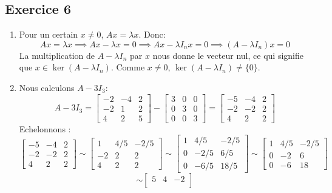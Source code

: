 \documentclass{article}
\begin{document}
\subsection*{Exercice 6}
\begin{enumerate}
    \item Pour un certain $x \neq 0$, $Ax=\lambda x$. Donc:
    $$Ax=\lambda x \implies Ax-\lambda x = 0 \implies Ax - \lambda I_nx = 0 \implies (A-\lambda I_n)x = 0$$
    La multiplication de $A-\lambda I_n$ par  $x$ nous donne le vecteur nul, ce qui signifie que $x \in \ker (A-\lambda I_n)$. Comme $x \neq 0$, $\ker (A-\lambda I_n) \neq \{0 \}$.
    \item Nous calculons $A-3I_3$:
    $$A-3I_3 = \begin{bmatrix} -2 & -4 & 2 \\ -2 & 1 & 2 \\ 4 & 2 & 5 \end{bmatrix} - \begin{bmatrix} 3 & 0 & 0 \\ 0 & 3 & 0 \\ 0 & 0 & 3 \end{bmatrix} = \begin{bmatrix} -5 & -4 & 2 \\ -2 & -2 & 2 \\ 4 & 2 & 2 \end{bmatrix}$$
    Echelonnons :
    $$\begin{bmatrix} -5 & -4 & 2 \\ 
    -2 & -2 & 2 \\ 
    4 & 2 & 2 
    \end{bmatrix} \sim 
    \begin{bmatrix} 
    1 & 4/5 & -2/5 \\ 
    -2 & 2 & 2 \\ 
    4 & 2 & 2 
    \end{bmatrix} \sim
    \begin{bmatrix} 
    1 & 4/5 & -2/5 \\ 
    0 & -2/5 & 6/5 \\ 
    0 & -6/5 & 18/5 
    \end{bmatrix} \sim
    \begin{bmatrix} 
    1 & 4/5 & -2/5 \\ 
    0 & -2 & 6 \\ 
    0 & -6 & 18 
    \end{bmatrix} $$
    $$\sim\begin{bmatrix} 
    5 & 4 & -2 \\ 

\end{bmatrix}$$
\end{enumerate}
\end{document}
